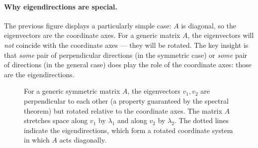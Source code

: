 \documentclass[11pt, a4paper, oneside]{article}
\begin{document}
\paragraph{Why eigendirections are special.}
The previous figure displays a particularly simple case: $A$ is
diagonal, so the eigenvectors are the coordinate axes. For a generic
matrix $A$, the eigenvectors will \emph{not} coincide with the
coordinate axes — they will be rotated. The key insight is that
\emph{some} pair of perpendicular directions (in the symmetric case)
or \emph{some} pair of directions (in the general case) does play
the role of the coordinate axes: those are the eigendirections.

\begin{figure}[H]
\centering
{}
\caption{For a generic symmetric matrix $A$, the eigenvectors $v_1,
v_2$ are perpendicular to each other (a property guaranteed by the
spectral theorem) but rotated relative to the coordinate axes. The
matrix $A$ stretches space along $v_1$ by $\lambda_1$ and along
$v_2$ by $\lambda_2$. The dotted lines indicate the eigendirections,
which form a rotated coordinate system in which $A$ acts diagonally.}
\label{fig:eigenvectors-rotated}
\end{figure}
\end{document}

